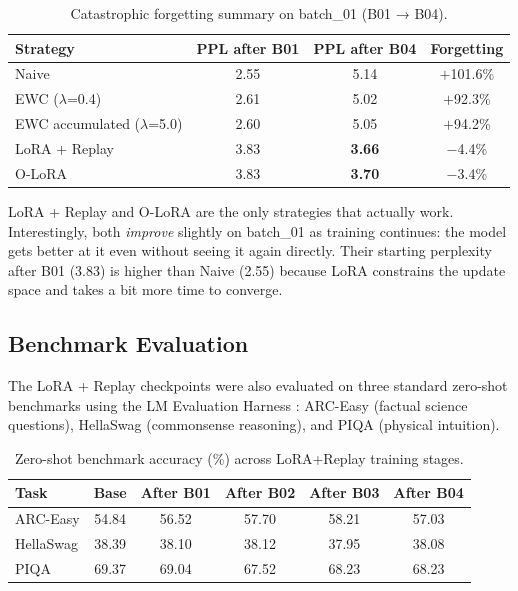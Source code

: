 \documentclass[11pt,a4paper]{article}
\begin{document}
\begin{table}[h]
\centering
\caption{Catastrophic forgetting summary on batch\_01 (B01 → B04).}
\label{tab:forgetting}
\begin{tabular}{lccc}
\toprule
\textbf{Strategy} & \textbf{PPL after B01} & \textbf{PPL after B04} & \textbf{Forgetting} \\
\midrule
Naive                      & 2.55 & 5.14 & $+$101.6\% \\
EWC ($\lambda$=0.4)        & 2.61 & 5.02 & $+$92.3\%  \\
EWC accumulated ($\lambda$=5.0) & 2.60 & 5.05 & $+$94.2\% \\
LoRA + Replay              & 3.83 & \textbf{3.66} & $-$4.4\% \\
O-LoRA                     & 3.83 & \textbf{3.70} & $-$3.4\% \\
\bottomrule
\end{tabular}
\end{table}

LoRA + Replay and O-LoRA are the only strategies that actually work. Interestingly, both \textit{improve} slightly on batch\_01 as training continues: the model gets better at it even without seeing it again directly. Their starting perplexity after B01 (3.83) is higher than Naive (2.55) because LoRA constrains the update space and takes a bit more time to converge.

\subsection{Benchmark Evaluation}

The LoRA + Replay checkpoints were also evaluated on three standard zero-shot benchmarks using the LM Evaluation Harness \cite{lmeval}: ARC-Easy \cite{arc} (factual science questions), HellaSwag \cite{hellaswag} (commonsense reasoning), and PIQA \cite{piqa} (physical intuition).

\begin{table}[h]
\centering
\caption{Zero-shot benchmark accuracy (\%) across LoRA+Replay training stages.}
\label{tab:benchmarks}
\begin{tabular}{lccccc}
\toprule
\textbf{Task} & \textbf{Base} & \textbf{After B01} & \textbf{After B02} & \textbf{After B03} & \textbf{After B04} \\
\midrule
ARC-Easy  & 54.84 & 56.52 & 57.70 & 58.21 & 57.03 \\
HellaSwag & 38.39 & 38.10 & 38.12 & 37.95 & 38.08 \\
PIQA      & 69.37 & 69.04 & 67.52 & 68.23 & 68.23 \\
\bottomrule
\end{tabular}
\end{table}
\end{document}
